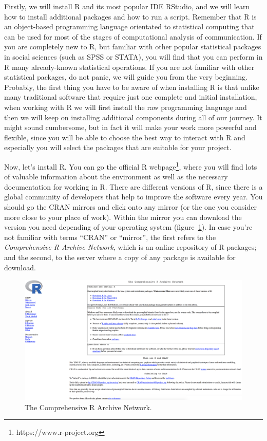 Firstly, we will install R and its most popular IDE RStudio, and we
will learn how to install additional packages and how to run a
script. Remember that R is an object-based programming language
orientated to statistical computing that can be used for most of the
stages of computational analysis of communication.  If you are
completely new to R, but familiar with other popular
statistical packages in social sciences (such as SPSS or STATA), you
will find that you can perform in R many already-known statistical
operations. If you are not familiar with other statistical packages,
do not panic, we will guide you from the very beginning. Probably, the
first thing you have to be aware of when installing R is that unlike
many traditional software that require just one complete and initial
installation, when working with R we will first install the raw
programming language and then we will keep on installing additional
components during all of our journey. It might sound cumbersome, but
in fact it will make your work more powerful and flexible, since you
will be able to choose the best way to interact with R and especially
you will select the packages that are suitable for your project.

Now, let's install R. You can go the official R
webpage\footnote{https://www.r-project.org}, where you will find lots
of valuable information about the environment as well as the necessary
documentation for working in R.  There are different versions of R,
since there is a global community of developers that help to improve
the software every year. You should go the CRAN mirrors and click onto
any mirror (or the one you consider more close to your place of
work). Within the mirror you can download the version you need
depending of your operating system (figure~\ref{fig:cran}). In case
you're not familiar with terms ``CRAN'' or ``mirror'', the first
refers to the \textit{Comprehensive R Archive Network}, which is an
online repository of R packages; and the second, to the server where a
copy of any package is available for download.

\begin{figure}
\centering
\includegraphics[width=0.9\linewidth]{figures/ch3_cran}
\caption{The Comprehensive R Archive Network.}
\label{fig:cran}
\end{figure}


